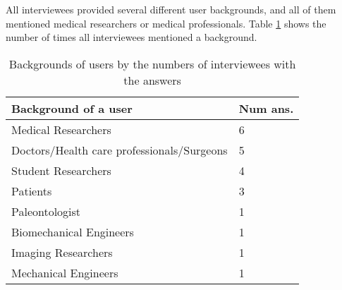 All interviewees provided several different user backgrounds, and all of them mentioned medical researchers or medical professionals. Table \ref{tab_q8_user_backgrounds} shows the number of times all interviewees mentioned a background.

\begin{table}[H]
\centering
\begin{tabular}{ll}
\hline
Background of a user & Num ans. \\ \hline
Medical Researchers & 6 \\
Doctors/Health care professionals/Surgeons & 5 \\
Student Researchers & 4 \\
Patients & 3 \\
Paleontologist & 1 \\
Biomechanical Engineers & 1 \\
Imaging Researchers & 1 \\
Mechanical Engineers & 1 \\ \hline
\end{tabular}
\caption{\label{tab_q8_user_backgrounds}Backgrounds of users by the numbers of interviewees with the answers}
\end{table}
